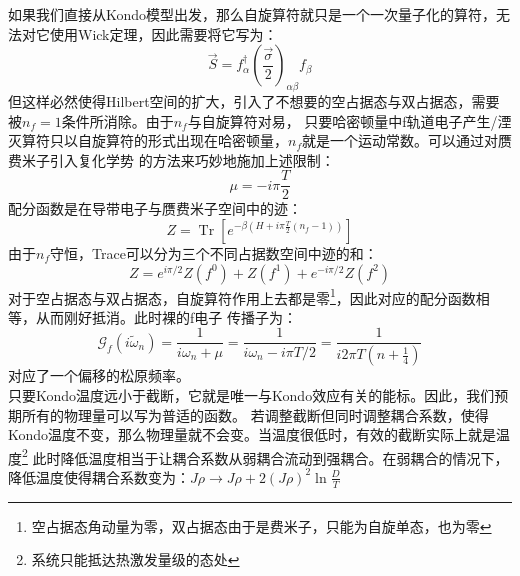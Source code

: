 \documentclass[10pt,openany]{book}
\theoremstyle{thmstyle} %
\theoremstyle{defstyle} %
\theoremstyle{prostyle} %
\begin{document}
如果我们直接从Kondo模型出发，那么自旋算符就只是一个一次量子化的算符，无法对它使用Wick定理，因此需要将它写为：
\begin{equation}
  \vec{S}=f_\alpha^{\dagger}\left(\frac{\vec{\sigma}}{2}\right)_{\alpha \beta} f_\beta
\end{equation}
但这样必然使得Hilbert空间的扩大，引入了不想要的空占据态与双占据态，需要被$ n_f=1 $条件所消除。由于$ n_f $与自旋算符对易，
只要哈密顿量中f轨道电子产生/湮灭算符只以自旋算符的形式出现在哈密顿量，$ n_f $就是一个运动常数。可以通过对赝费米子引入复化学势
的方法来巧妙地施加上述限制：
\begin{equation}
  \mu=-i \pi \frac{T}{2}
\end{equation}  
配分函数是在导带电子与赝费米子空间中的迹：
\begin{equation}
  Z=\operatorname{Tr}\left[e^{-\beta\left(H+i \pi \frac{T}{2}\left(n_f-1\right)\right)}\right]
\end{equation}
由于$ n_f $守恒，Trace可以分为三个不同占据数空间中迹的和：
\begin{equation}
  Z=e^{i \pi / 2} Z\left(f^0\right)+Z\left(f^1\right)+e^{-i \pi / 2} Z\left(f^2\right)
\end{equation} 
对于空占据态与双占据态，自旋算符作用上去都是零\footnote{空占据态角动量为零，双占据态由于是费米子，只能为自旋单态，也为零}，因此对应的配分函数相等，从而刚好抵消。此时裸的f电子
传播子为：
\begin{equation}
  \mathcal{G}_f\left(i \tilde{\omega}_n\right)=\frac{1}{i \omega_n+\mu}=\frac{1}{i \omega_n-i \pi T / 2}=\frac{1}{i 2 \pi T\left(n+\frac{1}{4}\right)}
\end{equation}
对应了一个偏移的松原频率。\\

只要Kondo温度远小于截断，它就是唯一与Kondo效应有关的能标。因此，我们预期所有的物理量可以写为普适的函数。
若调整截断但同时调整耦合系数，使得Kondo温度不变，那么物理量就不会变。当温度很低时，有效的截断实际上就是温度\footnote{系统只能抵达热激发量级的态处}
此时降低温度相当于让耦合系数从弱耦合流动到强耦合。在弱耦合的情况下，降低温度使得耦合系数变为：$ J \rho \rightarrow J \rho+2(J \rho)^2 \ln \frac{D}{T} $ 
\end{document}
